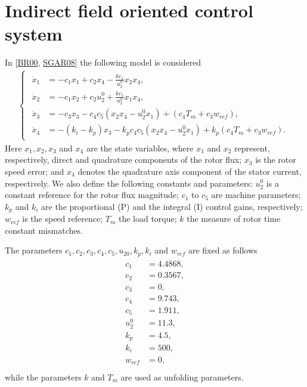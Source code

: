 \documentclass[letterpaper,10pt,english]{jupyterBook}
\begin{document}
\chapter{Indirect field oriented control system}
\label{\detokenize{IFOC:indirect-field-oriented-control-system}}\label{\detokenize{IFOC::doc}}
\sphinxAtStartPar
In {[}\hyperlink{cite.references:id12}{BR00}, \hyperlink{cite.references:id13}{SGAR08}{]} the following model is considered
\begin{equation}\label{equation:IFOC:eq:IFOC}
\begin{split}\begin{cases}
\begin{aligned}
\dot x_1 &= -c_1 x_1 + c_2 x_4 - \frac{k c_1}{u_2^0} x_2 x_4, \\
\dot x_2 &= -c_1 x_2 + c_2 u_2^0 + \frac{k c_1}{u_2^0} x_1 x_4, \\
\dot x_3 &= -c_3 x_3 - c_4 c_5 (x_2x_4 - u_2^0 x_1) + (c_4 T_m + c_3 w_{ref}), \\
\dot x_4 &= -(k_i-k_p)x_3 - k_p c_4 c_5 ( x_2 x_4 - u_2^0 x_1) + k_p (c_4 T_m + c_3 w_{ref}).
\end{aligned}
\end{cases}\end{split}
\end{equation}
\sphinxAtStartPar
Here \(x_1 , x_2 , x_3\) and \(x_4\) are the state variables, where \(x_1\) and \(x_2\)
represent, respectively, direct and quadrature components of the rotor ﬂux;
\(x_3\) is the rotor speed error; and \(x_4\) denotes the quadrature axis component
of the stator current, respectively.  We also deﬁne the following constants and
parameters: \(u_2^0\) is a constant reference for the rotor ﬂux magnitude; \(c_1\)
to \(c_5\) are machine parameters; \(k_p\) and \(k_i\) are the proportional (P) and
the integral (I) control gains, respectively; \(w_{ref}\) is the speed reference;
\(T_m\) the load torque; \(k\) the measure of rotor time constant mismatches.

\sphinxAtStartPar
The parameters \(c_1,c_2,c_3,c_4,c_5,u_{20},k_p,k_i\) and \(w_{ref}\) are fixed as
follows
\begin{equation*}
\begin{split}
\begin{aligned}
c_1 &= 4.4868, \\
c_2 &= 0.3567, \\
c_3 &= 0, \\
c_4 &= 9.743, \\
c_5 &= 1.911, \\
u_2^0 &= 11.3, \\
k_p &= 4.5, \\
k_i &= 500, \\
w_{ref} &= 0, \\
\end{aligned}
\end{split}
\end{equation*}
\sphinxAtStartPar
while the parameters \(k\) and \(T_m\) are used as unfolding parameters.
\end{document}
